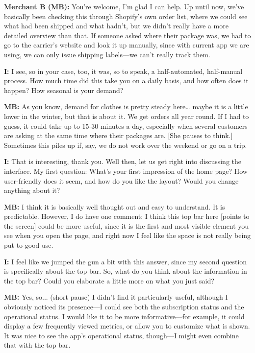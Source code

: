 \documentclass{imc-inf}
\begin{document}
\begin{appendices}
  \noindent\textbf{Merchant B (MB):} You're welcome, I'm glad I can help. Up until now, we've basically been checking this through Shopify's own order list, where we could see what had been shipped and what hadn't, but we didn't really have a more detailed overview than that. If someone asked where their package was, we had to go to the carrier's website and look it up manually, since with current app we are using, we can only issue shipping labels—we can’t really track them.

  \noindent\textbf{I:} I see, so in your case, too, it was, so to speak, a half-automated, half-manual process. How much time did this take you on a daily basis, and how often does it happen? How seasonal is your demand?

  \noindent\textbf{MB:} As you know, demand for clothes is pretty steady here… maybe it is a little lower in the winter, but that is about it. We get orders all year round. If I had to guess, it could take up to 15-30 minutes a day, especially when several customers are asking at the same time where their packages are. [She pauses to think.] Sometimes this piles up if, say, we do not work over the weekend or go on a trip.

  \noindent\textbf{I:} That is interesting, thank you. Well then, let us get right into discussing the interface. My first question: What's your first impression of the home page? How user-friendly does it seem, and how do you like the layout? Would you change anything about it?

  \noindent\textbf{MB:} I think it is basically well thought out and easy to understand. It is predictable. However, I do have one comment: I think this top bar here [points to the screen] could be more useful, since it is the first and most visible element you see when you open the page, and right now I feel like the space is not really being put to good use.

  \noindent\textbf{I:} I feel like we jumped the gun a bit with this answer, since my second question is specifically about the top bar. So, what do you think about the information in the top bar? Could you elaborate a little more on what you just said?

  \noindent\textbf{MB:} Yes, so... (short pause) I didn't find it particularly useful, although I obviously noticed its presence—I could see both the subscription status and the operational status. I would like it to be more informative—for example, it could display a few frequently viewed metrics, or allow you to customize what is shown. It was nice to see the app's operational status, though—I might even combine that with the top bar.


\end{appendices}
\end{document}
